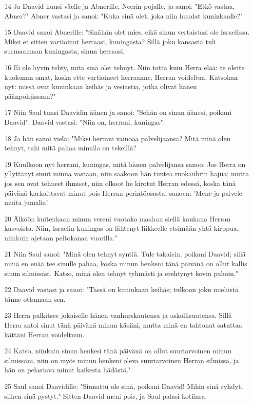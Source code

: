 \par 14 Ja Daavid huusi väelle ja Abnerille, Neerin pojalle, ja sanoi: "Etkö vastaa, Abner?" Abner vastasi ja sanoi: "Kuka sinä olet, joka niin huudat kuninkaalle?"
\par 15 Daavid sanoi Abnerille: "Sinähän olet mies, eikä sinun vertaistasi ole Israelissa. Miksi et sitten vartioinut herraasi, kuningasta? Sillä joku kansasta tuli surmaamaan kuningasta, sinun herraasi.
\par 16 Ei ole hyvin tehty, mitä sinä olet tehnyt. Niin totta kuin Herra elää: te olette kuoleman omat, koska ette vartioineet herraanne, Herran voideltua. Katsohan nyt: missä ovat kuninkaan keihäs ja vesiastia, jotka olivat hänen päänpohjissaan?"
\par 17 Niin Saul tunsi Daavidin äänen ja sanoi: "Sehän on sinun äänesi, poikani Daavid". Daavid vastasi: "Niin on, herrani, kuningas".
\par 18 Ja hän sanoi vielä: "Miksi herrani vainoaa palvelijaansa? Mitä minä olen tehnyt, tahi mitä pahaa minulla on tekeillä?
\par 19 Kuulkoon nyt herrani, kuningas, mitä hänen palvelijansa sanoo: Jos Herra on yllyttänyt sinut minua vastaan, niin saakoon hän tuntea ruokauhrin hajua; mutta jos sen ovat tehneet ihmiset, niin olkoot he kirotut Herran edessä, koska tänä päivänä karkoittavat minut pois Herran perintöosasta, sanoen: 'Mene ja palvele muita jumalia'.
\par 20 Älköön kuitenkaan minun vereni vuotako maahan siellä kaukana Herran kasvoista. Niin, Israelin kuningas on lähtenyt liikkeelle etsimään yhtä kirppua, niinkuin ajetaan peltokanaa vuorilla."
\par 21 Niin Saul sanoi: "Minä olen tehnyt syntiä. Tule takaisin, poikani Daavid; sillä minä en enää tee sinulle pahaa, koska minun henkeni tänä päivänä on ollut kallis sinun silmissäsi. Katso, minä olen tehnyt tyhmästi ja erehtynyt kovin pahoin."
\par 22 Daavid vastasi ja sanoi: "Tässä on kuninkaan keihäs; tulkoon joku miehistä tänne ottamaan sen.
\par 23 Herra palkitsee jokaiselle hänen vanhurskautensa ja uskollisuutensa. Sillä Herra antoi sinut tänä päivänä minun käsiini, mutta minä en tahtonut satuttaa kättäni Herran voideltuun.
\par 24 Katso, niinkuin sinun henkesi tänä päivänä on ollut suuriarvoinen minun silmissäni, niin on myös minun henkeni oleva suuriarvoinen Herran silmissä, ja hän on pelastava minut kaikesta hädästä."
\par 25 Saul sanoi Daavidille: "Siunattu ole sinä, poikani Daavid! Mihin sinä ryhdyt, siihen sinä pystyt." Sitten Daavid meni pois, ja Saul palasi kotiinsa.

